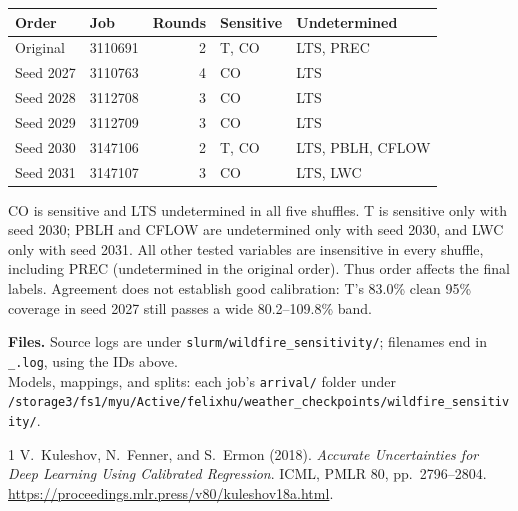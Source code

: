 \documentclass[11pt]{article}
\begin{document}
\begin{center}
\small
\begin{tabular}{llrll}
\toprule
Order & Job & Rounds & Sensitive & Undetermined \\
\midrule
Original & 3110691 & 2 & T, CO & LTS, PREC \\
Seed 2027 & 3110763 & 4 & CO & LTS \\
Seed 2028 & 3112708 & 3 & CO & LTS \\
Seed 2029 & 3112709 & 3 & CO & LTS \\
Seed 2030 & 3147106 & 2 & T, CO & LTS, PBLH, CFLOW \\
Seed 2031 & 3147107 & 3 & CO & LTS, LWC \\
\bottomrule
\end{tabular}
\end{center}

CO is sensitive and LTS undetermined in all five shuffles. T is sensitive only
with seed 2030; PBLH and CFLOW are undetermined only with seed 2030, and LWC only
with seed 2031. All other tested variables are insensitive in every shuffle,
including PREC (undetermined in the original order). Thus order affects the final
labels. Agreement does not establish good calibration: T's 83.0\% clean 95\%
coverage in seed 2027 still passes a wide 80.2--109.8\% band.

{\footnotesize
\textbf{Files.} Source logs are under \nolinkurl{slurm/wildfire_sensitivity/};
filenames end in \texttt{\_<job ID>.log}, using the IDs above.\\
Models, mappings, and splits: each job's \texttt{arrival/} folder under\\
\nolinkurl{/storage3/fs1/myu/Active/felixhu/weather_checkpoints/wildfire_sensitivity/}.
}

\begin{thebibliography}{1}
\small
{}
V.~Kuleshov, N.~Fenner, and S.~Ermon (2018).
\emph{Accurate Uncertainties for Deep Learning Using Calibrated Regression}.
ICML, PMLR 80, pp.~2796--2804.
\url{https://proceedings.mlr.press/v80/kuleshov18a.html}.
\end{thebibliography}
\end{document}
